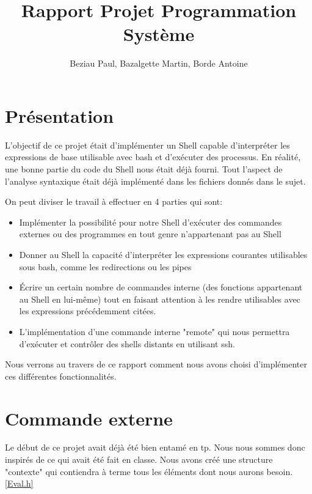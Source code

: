 \documentclass[12pt]{article}
\title{Rapport Projet Programmation Système}
\author{Beziau Paul, Bazalgette Martin, Borde Antoine}
\begin{document}
\maketitle
\tableofcontents

\newpage
\section{Présentation}

L'objectif de ce projet était d'implémenter un Shell capable d'interpréter les expressions de base
utilisable avec bash et d'exécuter des processus. En réalité, une bonne partie du code du Shell
nous était déjà fourni. Tout l'aspect de l'analyse syntaxique était déjà implémenté dans les fichiers
donnés dans le sujet.\newline

On peut diviser le travail à effectuer en 4 parties qui sont:
\begin{itemize}
 \item Implémenter la possibilité pour notre Shell d'exécuter des
 commandes externes ou des programmes en tout genre n'appartenant pas au Shell
 \item Donner au Shell la capacité d'interpréter les expressions courantes
 utilisables sous bash, comme les redirections ou les pipes
 \item Écrire un certain nombre de commandes interne (des fonctions appartenant
 au Shell en lui-même) tout en faisant attention à les rendre utilisables avec
 les expressions précédemment citées.
 \item L'implémentation d'une commande interne "remote" qui nous permettra d'exécuter
 et contrôler des shells distants en utilisant ssh.\newline 
\end{itemize}

Nous verrons au travers de ce rapport comment nous avons choisi d'implémenter ces différentes
fonctionnalités.


\newpage

\section{Commande externe}
 
 Le début de ce projet avait déjà été bien entamé en tp. Nous nous sommes donc
 inspirés de ce qui avait été fait en classe. Nous avons créé une structure "contexte"
 qui contiendra à terme tous les éléments dont nous aurons besoin. \ref{Eval.h}
 
\end{document}
